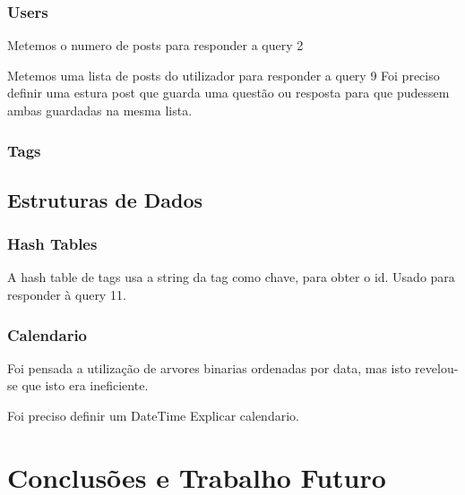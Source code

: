 \documentclass[11pt,a4paper]{report}
\begin{document}
        \subsection{Users}
        Metemos o numero de posts para responder a query 2

        Metemos uma lista de posts do utilizador para responder a query 9
        Foi preciso definir uma estura post que guarda uma questão ou resposta para
        que pudessem ambas guardadas na mesma lista.

        \subsection{Tags}

    \section{Estruturas de Dados}

        \subsection{Hash Tables}

        A hash table de tags usa a string da tag como chave, para obter o id.
        Usado para responder à query 11.

        \subsection{Calendario}
        Foi pensada a utilização de arvores binarias ordenadas por data, mas isto
        revelou-se que isto era ineficiente.

        Foi preciso definir um DateTime
        Explicar calendario.

\chapter{Conclusões e Trabalho Futuro}
\end{document}
